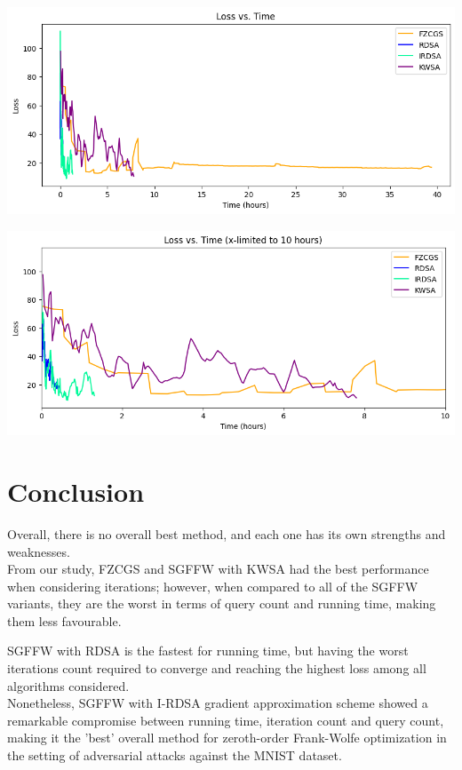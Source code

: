 \documentclass[10pt,twocolumn,letterpaper]{article}
\begin{document}
\begin{center}
   \includegraphics*[scale=0.35]{img/All_loss_vs_runningtime.png}
\end{center}
\begin{center}
   \includegraphics*[scale=0.35]{img/xLimit_All_loss_vs_runningtime.png}\\
\end{center}



\section{Conclusion}

Overall, there is no overall best method, and each one has its own strengths and weaknesses. \\

From our study, FZCGS and SGFFW with KWSA had the best performance when considering iterations;
however, when compared to all of the SGFFW variants, they are the worst in terms
of query count and running time, making them less favourable.

SGFFW with RDSA is the fastest for running time, but having the
worst iterations count required to converge and reaching the highest loss among all algorithms considered. \\

Nonetheless, SGFFW with I-RDSA gradient approximation scheme showed a remarkable
compromise between running time, iteration count and query count, making it the 'best' overall method
for zeroth-order Frank-Wolfe optimization in the setting of adversarial attacks against the MNIST dataset.


{\small


}
\end{document}
